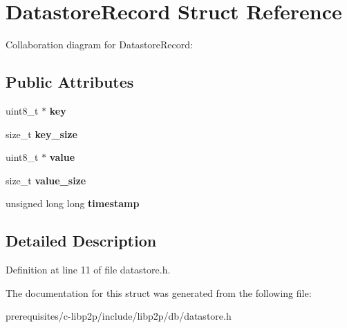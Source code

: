 \hypertarget{struct_datastore_record}{}\section{Datastore\+Record Struct Reference}
\label{struct_datastore_record}


Collaboration diagram for Datastore\+Record\+:
\subsection*{Public Attributes}
\begin{DoxyCompactItemize}
\item 
\mbox{\label{struct_datastore_record_a8eb43ed5cb39efe1878fc406c29651fd}} 
uint8\+\_\+t $\ast$ {\bfseries key}
\item 
\mbox{\label{struct_datastore_record_a3fb4d8fbf1758cc7c69ff7b8b3f3c702}} 
size\+\_\+t {\bfseries key\+\_\+size}
\item 
\mbox{\label{struct_datastore_record_a3fd72fdadbec28f8a465ce5dbafff5d3}} 
uint8\+\_\+t $\ast$ {\bfseries value}
\item 
\mbox{\label{struct_datastore_record_adae30c76681bf93d5e3bd7be5ee503a6}} 
size\+\_\+t {\bfseries value\+\_\+size}
\item 
\mbox{\label{struct_datastore_record_a97564511f2b881b3b4584db3fabe1cd7}} 
unsigned long long {\bfseries timestamp}
\end{DoxyCompactItemize}


\subsection{Detailed Description}


Definition at line 11 of file datastore.\+h.



The documentation for this struct was generated from the following file\+:\begin{DoxyCompactItemize}
\item 
prerequisites/c-\/libp2p/include/libp2p/db/datastore.\+h\end{DoxyCompactItemize}
